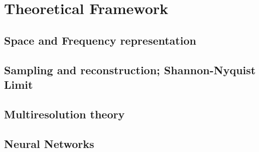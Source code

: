 \chapter{Theoretical Framework}

\section{Space and Frequency representation}


\section{Sampling and reconstruction; Shannon-Nyquist Limit} 

\section{Multiresolution theory}

\section{Neural Networks}



